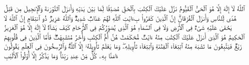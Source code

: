 \stopbuffer
\startbuffer[\q:3:2]
ٱللَّهُ لَاۤ إِلَٰهَ إِلَّا هُوَ ٱلۡحَیُّ ٱلۡقَیُّومُ%
\stopbuffer
\startbuffer[\q:3:3]
نَزَّلَ عَلَیۡكَ ٱلۡكِتَٰبَ بِٱلۡحَقِّ مُصَدِّقࣰا لِّمَا بَیۡنَ یَدَیۡهِ وَأَنزَلَ ٱلتَّوۡرَىٰةَ وَٱلۡإِنجِیلَ%
\stopbuffer
\startbuffer[\q:3:4]
مِن قَبۡلُ هُدࣰى لِّلنَّاسِ وَأَنزَلَ ٱلۡفُرۡقَانَۗ إِنَّ ٱلَّذِینَ كَفَرُوا۟ بِءَایَٰتِ ٱللَّهِ لَهُمۡ عَذَابࣱ شَدِیدࣱۗ وَٱللَّهُ عَزِیزࣱ ذُو ٱنتِقَامٍ%
\stopbuffer
\startbuffer[\q:3:5]
إِنَّ ٱللَّهَ لَا یَخۡفَىٰ عَلَیۡهِ شَیۡءࣱ فِی ٱلۡأَرۡضِ وَلَا فِی ٱلسَّمَاۤءِ%
\stopbuffer
\startbuffer[\q:3:6]
هُوَ ٱلَّذِی یُصَوِّرُكُمۡ فِی ٱلۡأَرۡحَامِ كَیۡفَ یَشَاۤءُۚ لَاۤ إِلَٰهَ إِلَّا هُوَ ٱلۡعَزِیزُ ٱلۡحَكِیمُ%
\stopbuffer
\startbuffer[\q:3:7]
هُوَ ٱلَّذِیۤ أَنزَلَ عَلَیۡكَ ٱلۡكِتَٰبَ مِنۡهُ ءَایَٰتࣱ مُّحۡكَمَٰتٌ هُنَّ أُمُّ ٱلۡكِتَٰبِ وَأُخَرُ مُتَشَٰبِهَٰتࣱۖ فَأَمَّا ٱلَّذِینَ فِی قُلُوبِهِمۡ زَیۡغࣱ فَیَتَّبِعُونَ مَا تَشَٰبَهَ مِنۡهُ ٱبۡتِغَاۤءَ ٱلۡفِتۡنَةِ وَٱبۡتِغَاۤءَ تَأۡوِیلِهِۦۖ وَمَا یَعۡلَمُ تَأۡوِیلَهُۥۤ إِلَّا ٱللَّهُۗ وَٱلرَّٰسِخُونَ فِی ٱلۡعِلۡمِ یَقُولُونَ ءَامَنَّا بِهِۦ كُلࣱّ مِّنۡ عِندِ رَبِّنَاۗ وَمَا یَذَّكَّرُ إِلَّاۤ أُو۟لُوا۟ ٱلۡأَلۡبَٰبِ%
\stopbuffer
